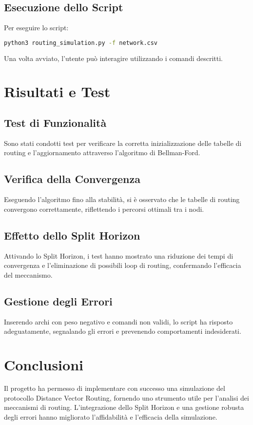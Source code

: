 \documentclass[a4paper,12pt]{article}
\begin{document}
	\subsection{Esecuzione dello Script}
	
	Per eseguire lo script:
	
	\begin{lstlisting}[language=bash, caption={Esecuzione dello script}]
		python3 routing_simulation.py -f network.csv
	\end{lstlisting}
	
	Una volta avviato, l'utente può interagire utilizzando i comandi descritti.
	
	\section{Risultati e Test}
	
	\subsection{Test di Funzionalità}
	
	Sono stati condotti test per verificare la corretta inizializzazione delle tabelle di routing e l'aggiornamento attraverso l'algoritmo di Bellman-Ford.
	
	\subsection{Verifica della Convergenza}
	
	Eseguendo l'algoritmo fino alla stabilità, si è osservato che le tabelle di routing convergono correttamente, riflettendo i percorsi ottimali tra i nodi.
	
	\subsection{Effetto dello Split Horizon}
	
	Attivando lo Split Horizon, i test hanno mostrato una riduzione dei tempi di convergenza e l'eliminazione di possibili loop di routing, confermando l'efficacia del meccanismo.
	
	\subsection{Gestione degli Errori}
	
	Inserendo archi con peso negativo e comandi non validi, lo script ha risposto adeguatamente, segnalando gli errori e prevenendo comportamenti indesiderati.
	
	\section{Conclusioni}
	
	Il progetto ha permesso di implementare con successo una simulazione del protocollo Distance Vector Routing, fornendo uno strumento utile per l'analisi dei meccanismi di routing. L'integrazione dello Split Horizon e una gestione robusta degli errori hanno migliorato l'affidabilità e l'efficacia della simulazione.
	
\end{document}
